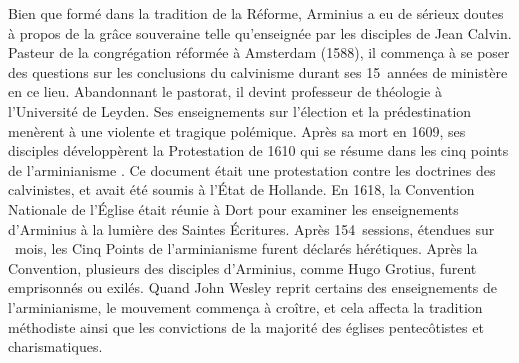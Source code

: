\begin{specialpar}{}
Bien que formé dans la tradition de la Réforme, Arminius a eu de sérieux doutes
 à propos de \og la grâce souveraine \fg{}  telle qu'enseignée
 par les disciples de Jean Calvin. Pasteur de la congrégation réformée à Amsterdam (1588),
 il commença à se poser des questions sur les conclusions du calvinisme
 durant ses 15~années de ministère en ce lieu. Abandonnant le pastorat,
 il devint professeur de théologie à l'Université de Leyden.
 Ses enseignements sur l'élection et la prédestination menèrent à une violente
 et tragique polémique. Après sa mort en 1609, ses disciples développèrent la Protestation
 de 1610 qui se résume dans les \og cinq points de l'arminianisme \fg{}.
 Ce document était une protestation contre les doctrines des calvinistes,
 et avait été soumis à l'État de Hollande. En 1618, la Con\-vention Nationale
 de l'Église était réunie à Dort pour examiner les enseignements d'Arminius
 à la lumière des Saintes Écritures. Après 154~sessions, étendues sur ~mois,
 les Cinq Points de l'arminianisme furent déclarés hérétiques.
 Après la Con\-ven\-tion, plusieurs des disciples d'Armi\-nius, comme Hugo Grotius,
 furent emprisonnés ou exilés. Quand John Wesley reprit certains des enseignements
 de l'armi\-nia\-nisme, le mouvement  commença à croître, et cela affecta la tradition méthodiste
 ainsi que les convictions de la majorité des églises pentecôtistes et charismatiques.
\end{specialpar}


